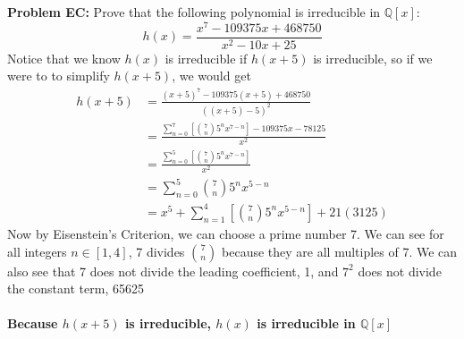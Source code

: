 \documentclass[12pt]{article}
\begin{document}
\noindent \textbf{Problem EC: }Prove that the following polynomial is irreducible in $\mathbb{Q}[x]$:
	$$
	h(x) = \frac{x^7 - 109375x +468750}{x^2 - 10x + 25}
	$$
	Notice that we know $h(x)$ is irreducible if $h(x+5)$ is irreducible, so if we were to to simplify $h(x+5)$, we would get
		\begin{align*}
			h(x+5) &= \frac{(x+5)^7 - 109375(x+5) + 468750}{((x+5) - 5)^2}  \\
			&= \frac{\sum_{n=0}^{7} \left[ \binom{7}{n} 5^nx^{7-n}\right]  - 109375x - 78125}{x^2} \\
			&= \frac{\sum_{n=0}^{5}\left[ \binom{7}{n} 5^nx^{7-n}\right] }{x^2} \\
			&= \sum_{n=0}^{5} \binom{7}{n} 5^nx^{5-n} \\
			&= x^5 + \sum_{n=1}^{4} \left[ \binom{7}{n} 5^nx^{5-n}\right]  + 21(3125)
		\end{align*}
	Now by Eisenstein's Criterion, we can choose a prime number 7.  We can see for all integers $n \in [1,4]$, 7 divides $\binom{7}{n}$ because they are all multiples of 7.  We can also see that 7 does not divide the leading coefficient, 1, and $7^2$ does not divide the constant term, 65625
	\\ \\
	\textbf{\boldmath Because $h(x+5)$ is irreducible, $h(x)$ is irreducible in $\mathbb{Q}[x]$}
\newpage
\end{document}
